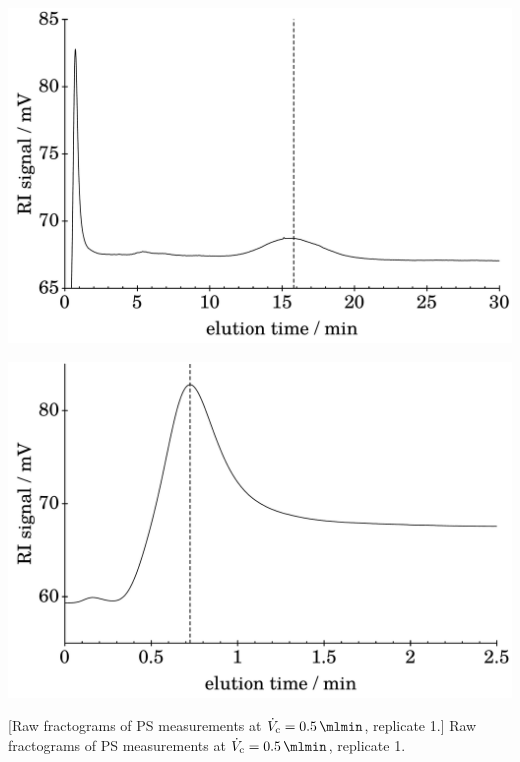 \begin{minipage}{\linewidth}
\begin{center}
\begin{minipage}{\subFigSize}
    \end{minipage}
    \\
  \begin{minipage}{\subFigSize} 
    \includegraphics[width=\linewidth]{./images/data/rawPlots/img_PS_VC_05_rep1_te_RI.pdf}
    \label{subfig:raw_PS2_5_r1_te_RI}
  \end{minipage}
  \begin{minipage}{\subFigSize}
    \includegraphics[width=\linewidth]{./images/data/rawPlots/img_PS_VC_05_rep1_t0_RI.pdf}
\end{minipage}
  \end{center}
\vspace*{-4ex}    
[Raw fractograms of PS measurements at $\Vc = \SI{0.5}{\mlmin}$, replicate 1.]{
Raw fractograms of PS 
measurements at $\Vc = \SI{0.5}{\mlmin}$, replicate 1.}
\label{fig:raw_PS_0_5_rep1} 
\end{minipage}\vspace*{2ex}
